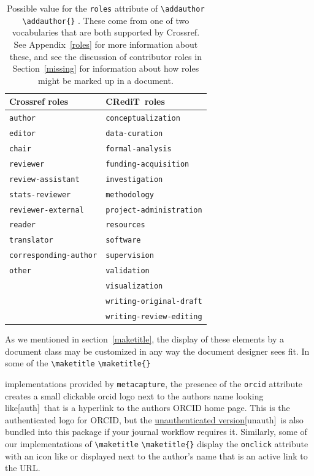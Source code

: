 \documentclass{article}
\newcommand{\pkgname}{\texttt{metacapture}}
\newcommand\CREDIT{CRediT}
\newcommand{\cmd}[2][]{%
  \def\FirstArg{#1}%
  \ifx\FirstArg\empty%
    \texttt{\textbackslash{}#2}%
  \else%
    \texttt{\textbackslash{}#2\{#1\}}%
  \fi
}
\begin{document}
\begin{table}[H]
\centering
\begin{tabular}{ll}
\toprule
Crossref roles & \CREDIT\ roles \\
\midrule
\texttt{author} & \texttt{conceptualization} \\
\texttt{editor} & \texttt{data-curation} \\
\texttt{chair} & \texttt{formal-analysis} \\
\texttt{reviewer} & \texttt{funding-acquisition} \\
\texttt{review-assistant} & \texttt{investigation} \\
\texttt{stats-reviewer} & \texttt{methodology} \\
\texttt{reviewer-external} & \texttt{project-administration} \\
\texttt{reader} & \texttt{resources} \\
\texttt{translator} & \texttt{software} \\
\texttt{corresponding-author} & \texttt{supervision} \\
\texttt{other} & \texttt{validation} \\
& \texttt{visualization} \\
& \texttt{writing-original-draft} \\
& \texttt{writing-review-editing} \\
\bottomrule
\end{tabular}
\caption{Possible value for the \texttt{roles} attribute of \cmd{addauthor}.
These come from one of two vocabularies that are both supported by Crossref.
See Appendix~\ref{roles} for more information about these, and see the discussion of
contributor roles in Section~\ref{missing} for information about how roles might be marked
up in a document.}
\label{rolevalues}
\end{table}

As we mentioned in section~\ref{maketitle}, the display of these
elements by a document class may be customized in
any way the document designer sees fit. In some of the \cmd{maketitle}
implementations provided by \pkgname, the presence of
the \texttt{orcid} attribute creates a small clickable orcid logo next
to the authors name looking
like[auth]~that is a hyperlink to the
authors ORCID home page.  This is the authenticated logo for ORCID,
but the
\href{https://info.orcid.org/documentation/integration-guide/orcid-id-display-guidelines/#h-unauthenticated-orcid-ids-0}{unauthenticated
version}[unauth]~is also bundled into
this package if your journal workflow requires it. Similarly, some of
our implementations of \cmd{maketitle} display the \texttt{onclick}
attribute with an icon like 
or  displayed next to the author's name
that is an active link to the URL.
\end{document}

